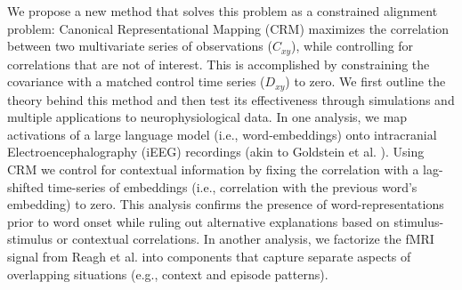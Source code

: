 \documentclass{article}
\begin{document}
We propose a new method that solves this problem as a constrained alignment problem: Canonical Representational Mapping (CRM) maximizes the correlation between two multivariate series of observations ($C_{xy}$), while controlling for correlations that are not of interest. This is accomplished by constraining the covariance with a matched control time series ($D_{xy}$) to zero. We first outline the theory behind this method and then test its effectiveness through simulations and multiple applications to neurophysiological data. In one analysis, we map activations of a large language model (i.e., word-embeddings) onto intracranial Electroencephalography (iEEG) recordings (akin to Goldstein et al. \cite{goldsteinAlignmentBrainEmbeddings2024}). Using CRM we control for contextual information by fixing the correlation with a lag-shifted time-series of embeddings (i.e., correlation with the previous word's embedding) to zero. This analysis confirms the presence of word-representations prior to word onset while ruling out alternative explanations based on stimulus-stimulus or contextual correlations. In another analysis, we factorize the fMRI signal from Reagh et al. \cite{reaghFlexibleReuseCorticohippocampal2023a} into components that capture separate aspects of overlapping situations (e.g., context and episode patterns).
%
\end{document}
